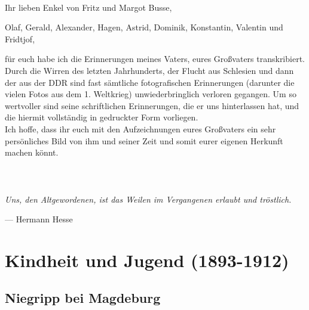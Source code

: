 \documentclass[a5paper,pagesize,10pt,twoside=true]{scrbook}
\begin{document}
\mbox{}
\newpage


 \leavevmode \\
Ihr lieben Enkel von Fritz und Margot Busse,\\

\begin{addmargin}[25pt]{30pt}
Olaf, Gerald, Alexander, Hagen, Astrid, Dominik, Konstantin, Valentin und Fridtjof,\\
\end{addmargin}

\noindent
für euch habe ich die Erinnerungen meines Vaters, eures Großvaters transkribiert. Durch die Wirren des letzten Jahrhunderts, der Flucht aus Schlesien und dann der aus der DDR sind fast sämtliche fotografischen Erinnerungen (darunter die vielen Fotos aus dem 1. Weltkrieg) unwiederbringlich verloren gegangen. Um so wertvoller sind seine schriftlichen Erinnerungen, die er uns hinterlassen hat, und die hiermit vollständig in gedruckter Form vorliegen.\\

\noindent
Ich hoffe, dass ihr euch mit den Aufzeichnungen eures Großvaters ein sehr persönliches Bild von ihm und seiner Zeit und somit eurer eigenen Herkunft machen könnt.\\

 \leavevmode \\

\chapter*{}
\begin{center}
	\parbox{10cm}{
			\begin{centering}
				{\Large 
					\textit{Uns, den Altgewordenen, ist das Weilen im Vergangenen erlaubt und tröstlich.}
				}
				
				\normalsize\vspace{.5cm}\hfill{--- Hermann Hesse}
			\end{centering}
		}
\end{center}


\chapter{Kindheit und Jugend (1893-1912)}
\section{Niegripp bei Magdeburg}
\end{document}
